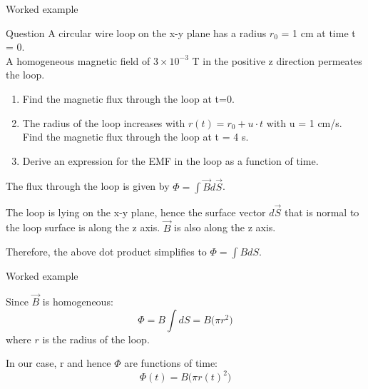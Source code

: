 {
\problemslide

%
%
%

\begin{frame}{Worked example }

\begin{blockexmplque}{Question}
A circular wire loop on the x-y plane has a radius $r_0$ = 1 cm at time t = 0. \\
A homogeneous magnetic field of $3 \times 10^{-3}$ T in the positive z direction permeates the loop.
\begin{enumerate}
  \item Find the magnetic flux through the loop at t=0.
  \item The radius of the loop increases with $\displaystyle r(t) = r_0 + u \cdot t$
        with u = 1 cm/s. Find the magnetic flux through the loop at t = 4 s.
  \item Derive an expression for the EMF in the loop as a function of time.
\end{enumerate}
\end{blockexmplque}

\vspace{0.1cm}


The flux through the loop is given by  $\displaystyle \Phi = \int \vec{B} d\vec{S}$.

The loop is lying on the x-y plane, hence the surface vector
$d\vec{S}$ that is normal to the loop surface is along the z axis.
$\vec{B}$ is also along the z axis.

Therefore, the above dot product simplifies to $\displaystyle \Phi = \int B dS$.

\end{frame}

%
%
%

\begin{frame}{Worked example }

Since $\vec{B}$ is homogeneous:
\begin{equation*}
     \Phi = B \int  dS =  B \Big( \pi r^2\Big)
\end{equation*}
where $r$ is the radius of the loop.

\vspace{0.4cm}

In our case, r and hence $\Phi$ are functions of time:
\begin{equation*}
     \Phi(t) = B \Big( \pi r(t)^2\Big)
\end{equation*}

\vspace{0.3cm}


\end{frame}}
